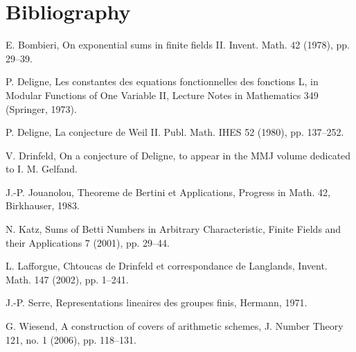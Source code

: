 \documentclass[10pt]{article}
\begin{document}
\section*{Bibliography}
\begin{description}[leftmargin=2.5em]
\item[{[B]}] E. Bombieri, On exponential sums in finite fields II. Invent. Math. 42 (1978), pp. 29--39.
\item[{[De1]}] P. Deligne, Les constantes des equations fonctionnelles des fonctions L, in Modular Functions of One Variable II, Lecture Notes in Mathematics 349 (Springer, 1973).
\item[{[De2]}] P. Deligne, La conjecture de Weil II. Publ. Math. IHES 52 (1980), pp. 137--252.
\item[{[Dr]}] V. Drinfeld, On a conjecture of Deligne, to appear in the MMJ volume dedicated to I. M. Gelfand.
\item[{[J]}] J.-P. Jouanolou, Theoreme de Bertini et Applications, Progress in Math. 42, Birkhauser, 1983.
\item[{[K]}] N. Katz, Sums of Betti Numbers in Arbitrary Characteristic, Finite Fields and their Applications 7 (2001), pp. 29--44.
\item[{[L]}] L. Lafforgue, Chtoucas de Drinfeld et correspondance de Langlands, Invent. Math. 147 (2002), pp. 1--241.
\item[{[S]}] J.-P. Serre, Representations lineaires des groupes finis, Hermann, 1971.
\item[{[W]}] G. Wiesend, A construction of covers of arithmetic schemes, J. Number Theory 121, no. 1 (2006), pp. 118--131.
\end{description}
\end{document}
